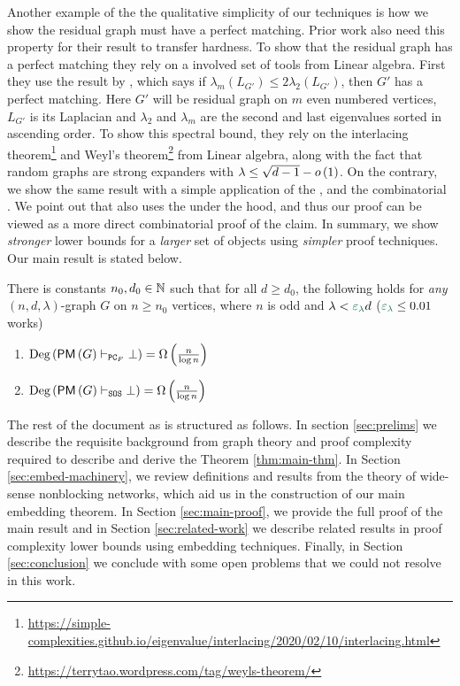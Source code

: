 \documentclass[11pt]{article}
\begin{document}
Another example of the the qualitative simplicity of our techniques is how we show the residual graph must have a perfect matching.
Prior work \cite{Austrin_2022} also need this property for their result to transfer hardness.
To show that the residual graph has a perfect matching they rely on a involved set of tools from Linear algebra.
First they use the result by \citet[Theorem 2.3]{brouwer2005eigenvalues}, which says if $\lambda_m(L_{G'}) \leq 2\lambda_2(L_{G'})$, then $G'$ has a perfect matching.
Here $G'$ will be residual graph on $m$ even numbered vertices, $L_{G'}$ is its Laplacian and $\lambda_2$ and $\lambda_m$ are the second and last eigenvalues sorted in ascending order. 
To show this spectral bound, they rely on the interlacing theorem\footnote{\url{https://simple-complexities.github.io/eigenvalue/interlacing/2020/02/10/interlacing.html}} and Weyl's theorem\footnote{\url{https://terrytao.wordpress.com/tag/weyls-theorem/}} from Linear algebra, along with the fact that random graphs are strong expanders with $\lambda \leq \sqrt{d-1} - o\left(1\right)$.
On the contrary, we show the same result with a simple application of the  , and the combinatorial .
We point out that \citep[Theorem 2.3]{brouwer2005eigenvalues} also uses the  under the hood, and thus our proof can be viewed as a more direct combinatorial proof of the claim.
In summary, we show \emph{stronger} lower bounds for a \emph{larger} set of objects using \emph{simpler} proof techniques.
Our main result is stated below.

\begin{theorem}\label{thm:main-thm}

There is constants $n_0, d_0 \in \mathbb{N}$ such that for all $d \geq d_0$, the following holds  for \emph{any} $(n, d, \lambda)$-graph $G$ on $n \geq n_0$ vertices, where $n$ is odd and $\lambda < \epsilonL d$ ($\epsilonL \leq 0.01$ works) 
\begin{enumerate}
    \item{ $\text{Deg}\left(\mathsf{PM}\left(G\right) \vdash_{\texttt{PC}_F} \bot\right) = \Omega\left(\frac{n}{\log n}\right)$} 
    \item{$\text{Deg}\left(\mathsf{PM}\left(G\right) \vdash_{\texttt{SOS}} \bot\right) = \Omega\left(\frac{n}{\log n}\right)$}
\end{enumerate}

\end{theorem}

The rest of the document as is structured as follows. In section \ref{sec:prelims} we describe the requisite background from graph theory and proof complexity required to describe and derive the Theorem \ref{thm:main-thm}.
In Section \ref{sec:embed-machinery}, we review definitions and results from the theory of wide-sense nonblocking networks, which aid us in the construction of our main embedding theorem.
In Section \ref{sec:main-proof}, we provide the full proof of the main result and in Section \ref{sec:related-work} we describe related results in proof complexity lower bounds using embedding techniques.
Finally, in Section \ref{sec:conclusion} we conclude with some open problems that we could not resolve in this work.
\end{document}
